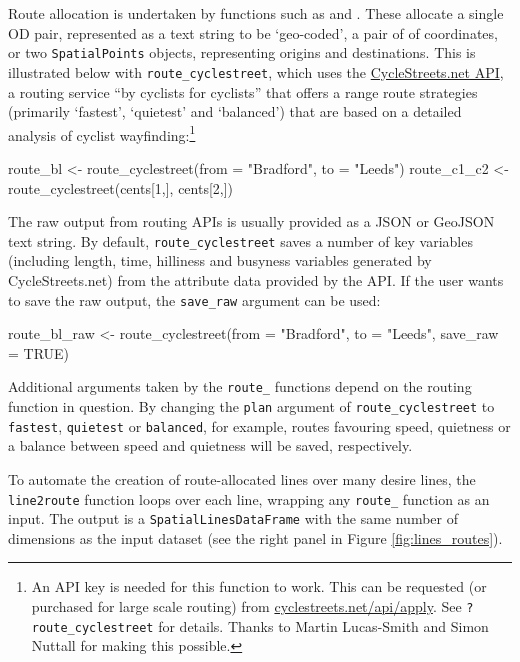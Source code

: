 Route allocation is undertaken by  functions such as
 and \linebreak {}.
These allocate a single OD pair, represented as a text string to be
`geo-coded', a pair of of coordinates, or two \texttt{SpatialPoints}
objects, representing origins and destinations. This is illustrated
below with \texttt{route\_cyclestreet}, which uses the
\href{http://www.cyclestreets.net/api/}{CycleStreets.net API}, a routing
service ``by cyclists for cyclists'' that offers a range route
strategies (primarily `fastest', `quietest' and `balanced') that are
based on a detailed analysis of cyclist wayfinding:\footnote{An API key
  is needed for this function to work. This can be requested (or
  purchased for large scale routing) from
  \href{https://www.cyclestreets.net/api/apply/}{cyclestreets.net/api/apply}.
  See \texttt{?route\_cyclestreet} for details. Thanks to Martin
  Lucas-Smith and Simon Nuttall for making this possible.}

\begin{Schunk}
\begin{Sinput}
route_bl <- route_cyclestreet(from = "Bradford", to = "Leeds")
route_c1_c2 <- route_cyclestreet(cents[1,], cents[2,])
\end{Sinput}
\end{Schunk}

The raw output from routing APIs is usually provided as a JSON or
GeoJSON text string. By default, \texttt{route\_cyclestreet} saves a
number of key variables (including length, time, hilliness and busyness
variables generated by CycleStreets.net) from the attribute data
provided by the API. If the user wants to save the raw output, the
\texttt{save\_raw} argument can be used:

\begin{Schunk}
\begin{Sinput}
route_bl_raw <- route_cyclestreet(from = "Bradford", to = "Leeds", save_raw = TRUE)
\end{Sinput}
\end{Schunk}

Additional arguments taken by the \texttt{route\_} functions depend on
the routing function in question. By changing the \texttt{plan} argument
of \texttt{route\_cyclestreet} to \texttt{fastest}, \texttt{quietest} or
\texttt{balanced}, for example, routes favouring speed, quietness or a
balance between speed and quietness will be saved, respectively.

To automate the creation of route-allocated lines over many desire
lines, the \texttt{line2route} function loops over each line, wrapping
any \texttt{route\_} function as an input. The output is a
\texttt{SpatialLinesDataFrame} with the same number of dimensions as the
input dataset (see the right panel in Figure \ref{fig:lines_routes}).

